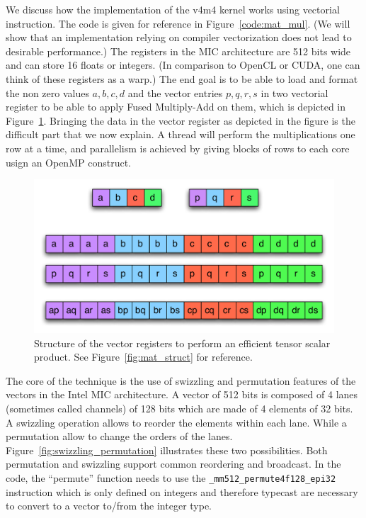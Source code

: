 \documentclass[10pt,conference,compsocconf]{IEEEtran}
\begin{document}
We discuss how the implementation of the v4m4 kernel works using
vectorial instruction. The code is given for reference in
Figure~\ref{code:mat_mul}. (We will show that an implementation
relying on compiler vectorization does not lead to desirable
performance.) The registers in the MIC architecture are 512 bits wide
and can store 16 floats or integers. (In comparison to OpenCL or CUDA,
one can think of these registers as a warp.) The end goal is to be
able to load and format the non zero values $a,b,c,d$ and the vector
entries $p,q,r,s$ in two vectorial register to be able to apply Fused
Multiply-Add on them, which is depicted in
Figure~\ref{fig:tensor_product}. Bringing the data in the vector
register as depicted in the figure is the difficult part that we now
explain. A thread will perform the multiplications one row at a time,
and parallelism is achieved by giving blocks of rows to each core
usign an OpenMP construct.

\begin{figure}
  \centering
  \includegraphics[width=\linewidth]{figures/tensor_product.pdf}
  \caption{Structure of the vector registers to perform an efficient
    tensor scalar product. See Figure~\ref{fig:mat_struct} for
    reference.}
  \label{fig:tensor_product}
\end{figure}

The core of the technique is the use of swizzling and permutation
features of the vectors in the Intel MIC architecture. A vector of 512
bits is composed of 4 lanes (sometimes called channels) of 128 bits
which are made of 4 elements of 32 bits. A swizzling operation allows
to reorder the elements within each lane. While a permutation allow to
change the orders of the lanes. Figure~\ref{fig:swizzling_permutation}
illustrates these two possibilities. Both permutation and swizzling
support common reordering and broadcast. In the code, the ``permute''
function needs to use the {\tt \_mm512\_permute4f128\_epi32}
instruction which is only defined on integers and therefore typecast
are necessary to convert to a vector to/from the integer type.
\end{document}
